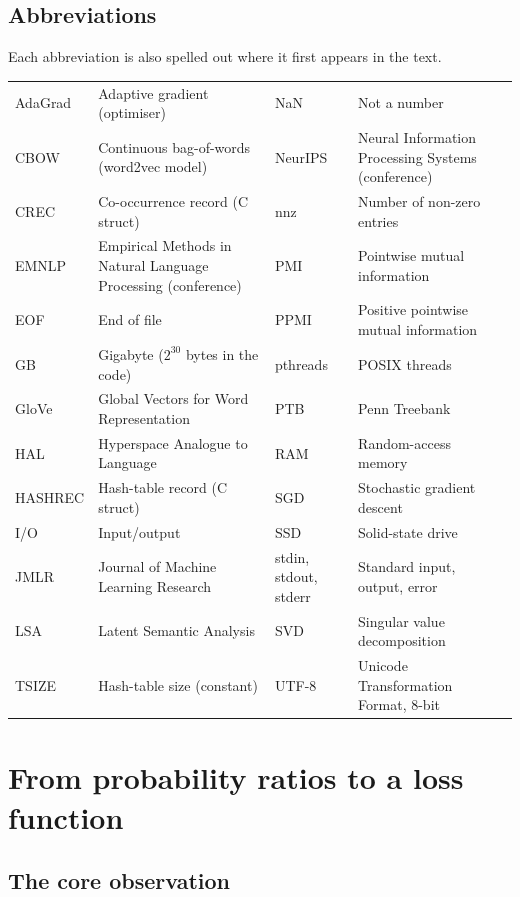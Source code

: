 \documentclass[11pt,a4paper]{article}
\begin{document}
\subsection*{Abbreviations}
Each abbreviation is also spelled out where it first appears in the text.
\begin{center}
\small
\begin{tabularx}{\linewidth}{@{}l>{\raggedright\arraybackslash}X@{\hspace{1.5em}}l>{\raggedright\arraybackslash}X@{}}
\toprule
AdaGrad & Adaptive gradient (optimiser) & NaN & Not a number \\
CBOW & Continuous bag-of-words (word2vec model) & NeurIPS & Neural Information Processing Systems (conference) \\
CREC & Co-occurrence record (C struct) & nnz & Number of non-zero entries \\
EMNLP & Empirical Methods in Natural Language Processing (conference) & PMI & Pointwise mutual information \\
EOF & End of file & PPMI & Positive pointwise mutual information \\
GB & Gigabyte ($2^{30}$ bytes in the code) & pthreads & POSIX threads \\
GloVe & Global Vectors for Word Representation & PTB & Penn Treebank \\
HAL & Hyperspace Analogue to Language & RAM & Random-access memory \\
HASHREC & Hash-table record (C struct) & SGD & Stochastic gradient descent \\
I/O & Input/output & SSD & Solid-state drive \\
JMLR & Journal of Machine Learning Research & stdin, stdout, stderr & Standard input, output, error \\
LSA & Latent Semantic Analysis & SVD & Singular value decomposition \\
TSIZE & Hash-table size (constant) & UTF-8 & Unicode Transformation Format, 8-bit \\
\bottomrule
\end{tabularx}
\end{center}

\section{From probability ratios to a loss function}

\subsection{The core observation}
\end{document}
